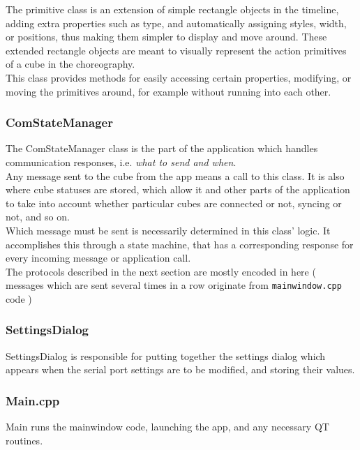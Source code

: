 The primitive class is an extension of simple rectangle objects in the timeline, adding extra properties such as type, and automatically assigning styles, width, or positions, thus making them simpler to display and move around. These extended rectangle objects are meant to visually represent the action primitives of a cube in the choreography.\\

This class provides methods for easily accessing certain properties, modifying, or moving the primitives around, for example without running into each other.

\subsubsection{ComStateManager}

 The ComStateManager class is the part of the application which handles communication responses, i.e. \textit{what to send and when}.\\
 
Any message sent to the cube from the app means a call to this class. It is also where cube statuses are stored, which allow it and other parts of the application to take into account whether particular cubes are connected or not, syncing or not, and so on.\\

Which message must be sent is necessarily determined in this class' logic.
It accomplishes this through a state machine, that has a corresponding response for every incoming message or application call.\\

The protocols described in the next section are mostly encoded in here ( messages which are sent several times in a row originate from \texttt{mainwindow.cpp} code )

\subsubsection{SettingsDialog}

SettingsDialog is responsible for putting together the settings dialog which appears when the serial port settings are to be modified, and storing their values.

\subsubsection{Main.cpp}

Main runs the mainwindow code, launching the app, and any necessary QT routines.

